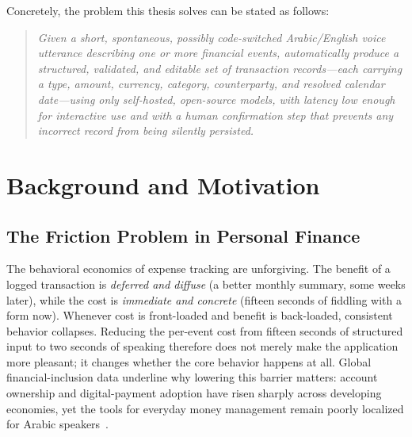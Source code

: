 Concretely, the problem this thesis solves can be stated as follows:

\begin{quote}
\itshape
Given a short, spontaneous, possibly code-switched Arabic/English voice
utterance describing one or more financial events, automatically produce a
structured, validated, and editable set of transaction records---each carrying a
type, amount, currency, category, counterparty, and resolved calendar
date---using only self-hosted, open-source models, with latency low enough for
interactive use and with a human confirmation step that prevents any incorrect
record from being silently persisted.
\end{quote}

\section{Background and Motivation}

\subsection{The Friction Problem in Personal Finance}

The behavioral economics of expense tracking are unforgiving. The benefit of a
logged transaction is \emph{deferred and diffuse} (a better monthly summary,
some weeks later), while the cost is \emph{immediate and concrete} (fifteen
seconds of fiddling with a form now). Whenever cost is front-loaded and benefit
is back-loaded, consistent behavior collapses. Reducing the per-event cost from
fifteen seconds of structured input to two seconds of speaking therefore does
not merely make the application more pleasant; it changes whether the core
behavior happens at all. Global financial-inclusion data underline why lowering
this barrier matters: account ownership and digital-payment adoption have risen
sharply across developing economies, yet the tools for everyday money management
remain poorly localized for Arabic speakers~\cite{worldbank2021findex}.

